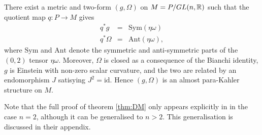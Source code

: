 \begin{theo}{\cite{DM}}\label{thm:DM}
There exist a metric and two-form
$(g,\Omega)$ on $\mbox{\ensuremath{M=P/GL(n,\mathbb{R})}}$ such
that the quotient map $q:P\rightarrow M$ gives
\begin{eqnarray} 
q^{*}g & = & \mathrm{Sym}(\eta\omega) \label{eq:g_cartan} \\
q^{*}\Omega & = & \mathrm{Ant}(\eta\omega), \label{eq:Omega_cartan}
\end{eqnarray}
where $\mathrm{Sym}$ and $\mathrm{Ant}$ denote the symmetric and
anti-symmetric parts of the $(0,2)$ tensor $\eta\omega$. Moreover,
$\Omega$ is closed as a consequence of the Bianchi identity, $g$
is Einstein with non-zero scalar curvature, and the two are related
by an endomorphism $J$ satisying $J^{2}=\mathrm{id}$. Hence $(g,\Omega)$
is an almost para-Kahler structure on $M$.
\end{theo}

Note that the full proof of theorem \ref{thm:DM} only appears explicitly in \cite{DM} in the case $n=2$, although it can be generalised to $n>2$. This generalisation is discussed in their appendix.



